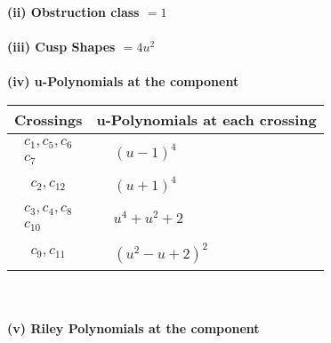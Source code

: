 \documentclass[1p]{elsarticle_modified}
\theoremstyle{definition}
\begin{document}
\flushleft \textbf{(ii) Obstruction class $= 1$}\\~\\
\flushleft \textbf{(iii) Cusp Shapes $= 4 u^2$}\\~\\
\newpage\renewcommand{\arraystretch}{1}
\flushleft \textbf{(iv) u-Polynomials at the component}\newline \\
\begin{tabular}{m{50pt}|m{274pt}}
Crossings & \hspace{64pt}u-Polynomials at each crossing \\
\hline $$\begin{aligned}c_{1},c_{5},c_{6}\\c_{7}\end{aligned}$$&$\begin{aligned}
&(u-1)^4
\end{aligned}$\\
\hline $$\begin{aligned}c_{2},c_{12}\end{aligned}$$&$\begin{aligned}
&(u+1)^4
\end{aligned}$\\
\hline $$\begin{aligned}c_{3},c_{4},c_{8}\\c_{10}\end{aligned}$$&$\begin{aligned}
&u^4+u^2+2
\end{aligned}$\\
\hline $$\begin{aligned}c_{9},c_{11}\end{aligned}$$&$\begin{aligned}
&(u^2- u+2)^2
\end{aligned}$\\
\hline
\end{tabular}\\~\\
\newpage\renewcommand{\arraystretch}{1}
\flushleft \textbf{(v) Riley Polynomials at the component}\newline \\
\end{document}
